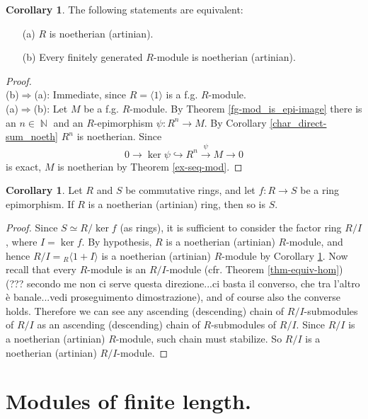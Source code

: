 \documentclass[12pt,a4paper]{report}
\theoremstyle{definition}
\newtheorem{corollary}[theorem]{Corollary} %
\theoremstyle{num.custom-title}
\DeclareMathOperator{\N}{\mathbb{N}}
\DeclareMathOperator{\imp}{\Rightarrow}
\begin{document}
\begin{corollary}\label{char_fg-subm_noeth}
The following statements are equivalent:
\begin{enumerate}
\item[(a)] $R$ is noetherian (artinian).
\item[(b)] Every finitely generated $R$-module is noetherian (artinian).
\end{enumerate}
\begin{proof}\ \\
(b)$\imp$(a): Immediate, since $R=\langle 1 \rangle$ is a f.g. $R$-module.
\\[6pt]
(a)$\imp$(b): Let $M$ be a f.g. $R$-module. By Theorem \ref{fg-mod_is_epi-image} there is an $n \in \N$ and an $R$-epimorphism $\psi: R^n \to M$. By Corollary \ref{char_direct-sum_noeth} $R^n$ is noetherian. Since
\[
0 \to \ker \psi \hookrightarrow R^n \stackrel{\psi}{\to} M \to 0
\]
is exact, $M$ is noetherian by Theorem \ref{ex-seq-mod}.
\end{proof}
\end{corollary}

\begin{corollary}
Let $R$ and $S$ be commutative rings, and let $f: R \to S$ be a ring epimorphism. If $R$ is a noetherian (artinian) ring, then so is $S$.
\begin{proof}
Since $S \simeq R/\ker f$ (as rings), it is sufficient to consider the factor ring $R/I$, where $I=\ker f$. By hypothesis, $R$ is a noetherian (artinian) $R$-module, and hence $R/I = {}_R \langle 1+I \rangle$ is a noetherian (artinian) $R$-module by Corollary \ref{char_fg-subm_noeth}. Now recall that every $R$-module is an $R/I$-module (cfr. Theorem \ref{thm-equiv-hom}) (??? secondo me non ci serve questa direzione...ci basta il converso, che tra l'altro è banale...vedi proseguimento dimostrazione), and of course also the converse holds. Therefore we can see any ascending (descending) chain of $R/I$-submodules of $R/I$ as an ascending (descending) chain of $R$-submodules of $R/I$. Since $R/I$ is a noetherian (artinian) $R$-module, such chain must stabilize. So $R/I$ is a noetherian (artinian) $R/I$-module.
\end{proof}
\end{corollary}

\section{Modules of finite length.	}
\end{document}
